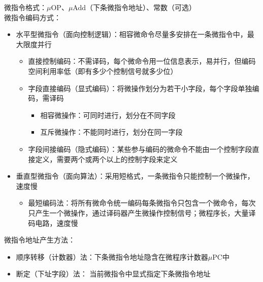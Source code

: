 微指令格式：$\mu$OP、$\mu$Add（下条微指令地址）、常数（可选）\\
微指令编码方式：
\begin{itemize}
	\item 水平型微指令（面向控制逻辑）：相容微命令尽量多安排在一条微指令中，最大限度并行
	\begin{itemize}
		\item 直接控制编码：不需译码，每个微命令用一位信息表示，易并行，但编码空间利用率低（即有多少个控制信号就多少位）
		\item 字段直接编码（显式编码）：将微操作划分为若干小字段，每个字段单独编码，需译码
		\begin{itemize}
			\item 相容微操作：可同时进行，划分在不同字段
			\item 互斥微操作：不能同时进行，划分在同一字段
		\end{itemize}
		\item 字段间接编码（隐式编码）：某些参与编码的微命令不能由一个控制字段直接定义，需要两个或两个以上的控制字段来定义
	\end{itemize}
	\item 垂直型微指令（面向算法）：采用短格式，一条微指令只能控制一个微操作，速度慢
	\begin{itemize}
		\item 最短编码法：将所有微命令统一编码每条微指令只包含一个微命令，每次只产生一个微操作，通过译码器产生微操作控制信号；微程序长，大量译码电路，速度慢
	\end{itemize}
\end{itemize}
微指令地址产生方法：
\begin{itemize}
	\item 顺序转移（计数器）法：下条微指令地址隐含在微程序计数器$\mu$PC中
	\item 断定（下址字段）法： 当前微指令中显式指定下条微指令地址
\end{itemize}